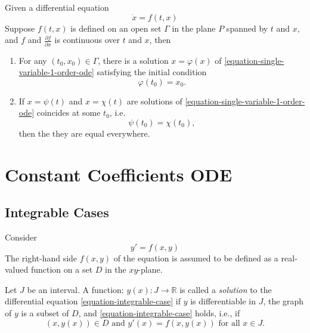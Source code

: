 \begin{theorem}
  \label{theorem-existence-and-uniqueness-order-1}
  Given a differential equation
  \begin{equation}
    \dot{x} = f(t, x) \label{equation-single-variable-1-order-ode}
  \end{equation}
  Suppose \( f(t, x) \) is defined on an open set \( \Gamma \) in the plane \( P \) spanned by \( t \) and \( x \), and \( f \) and \( \frac{\partial f}{\partial x} \) is continuous over \( t \) and \( x \), then
  \begin{enumerate}
    \item For any \( (t_0, x_0) \in \Gamma \), there is a solution \( x = \varphi(x) \) of \eqref{equation-single-variable-1-order-ode} satisfying the initial condition
      \[
        \varphi(t_0) = x_0.
      \]
    \item If \( x = \psi(t) \) and \( x = \chi(t) \) are solutions of \eqref{equation-single-variable-1-order-ode} coincides at some \( t_0 \), i.e.
      \[
        \psi(t_0) = \chi(t_0),
      \]
      then the they are equal everywhere.
  \end{enumerate}
\end{theorem}


\section{Constant Coefficients ODE}
\label{section-constant-coefficients-ode}

\subsection{Integrable Cases}
\label{subsection-integrable-cases}

Consider
\begin{equation}
  y' = f(x, y)\label{equation-integrable-case}
\end{equation}
The right-hand side \( f(x, y) \) of the equation is assumed to be defined as a real-valued function on a set \( D \) in the \( xy \)-plane.

\begin{definition}
  \label{definition-solution}
  Let \( J \) be an interval.
  A function: \( y(x): J \to \mathbb{R} \) is called a \emph{solution} to the differential equation \ref{equation-integrable-case} if \( y \) is differentiable in \( J \), the graph of \( y \) is a subset of \( D \), and \ref{equation-integrable-case} holds, i.e., if
  \[
    (x, y(x)) \in D \text{ and } y'(x) = f(x, y(x)) \text{ for all } x \in J.
  \]
\end{definition}

